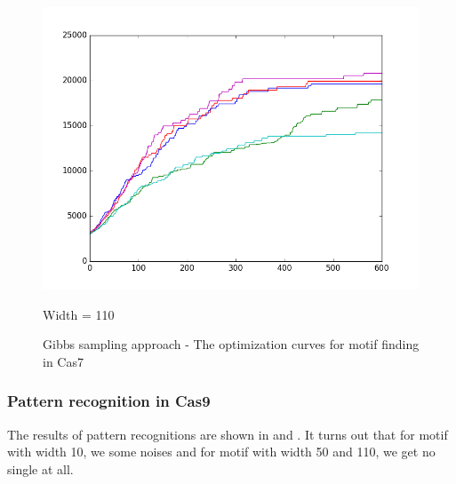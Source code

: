 \documentclass[11pt, oneside]{article}
\begin{document}
\begin{figure}[htbp]
\begin{minipage}{0.32\textwidth}
    \includegraphics[width=1\textwidth]{images/cas7_width110_curve} %
    \caption*{Width = 110}
  \end{minipage}
  \caption{Gibbs sampling approach - The optimization curves for motif finding in Cas7}
  \label{fig:cas7}
\end{figure}

\subsubsection{Pattern recognition in Cas9}

The results of pattern recognitions are shown in  and . It turns out that for motif with width 10, we some noises and for motif with width 50 and 110, we get no single at all.
\end{document}
